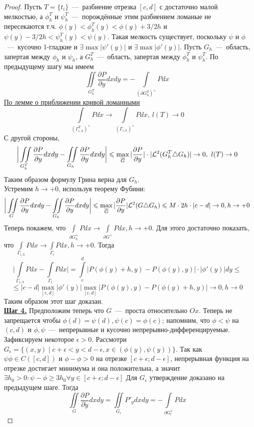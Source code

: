 \begin{proof}
        Пусть $T = \{t_i\}$~---~разбиение отрезка $[c, d]$ с достаточно малой мелкостью, а $\phi_h^T$ и $\psi_h^T$~---~порождённые этим разбиением ломаные не пересекаются т.ч. $\phi(y) < \phi_h^T(y) < \phi(y) + 3/2h$ и $\psi(y) - 3/2h < \psi_h^T(y) < \psi(y)$. Такая мелкость существует, поскольку $\psi$ и $\phi$~---~кусочно 1-гладкие и $\exists \max |\psi'(y)|$ и $\exists \max |\phi'(y)|$. Пусть $G_h$~---~область, запертая между $\phi_h$ и $\psi_h$, а $G_{h}^T$~---~область, запертая между $\phi_h^T$ и $\psi_h^T$. По предыдущему шагу мы имеем \[\iint\limits_{G_h^T} \dfrac{\partial P}{\partial y}dxdy = -\int\limits_{(\partial G_h^T)^+} Pdx\]
        \hyperlink{krivaya_lomanaya}{По лемме о приближении кривой ломанными}\[\int\limits_{(\Gamma_{i, h}^T)^+} Pdx \longrightarrow \int\limits_{(\Gamma_{i, h})^+}Pdx, \  l(T) \rightarrow 0\]
         С другой стороны, \[\biggr|\iint\limits_{G_h^T}\dfrac{\partial P}{\partial y} dxdy - \iint\limits_{G_h}\dfrac{\partial P}{\partial y}dxdy\biggr| \leqslant \max\limits_{\overline{G}}|\dfrac{\partial P}{\partial y}|\cdot |\mathcal{L}^2(G_h^T \triangle G_h)| \rightarrow 0, \  l(T) \rightarrow 0\]
        Таким образом формулу Грина верна для $G_h$. \\
        Устремим $h \rightarrow +0$, используя теорему Фубини:
        \[\biggr|\iint\limits_G \dfrac{\partial P}{\partial y} dxdy - \iint\limits_{G_h} \dfrac{\partial P}{\partial y} dxdy\biggr| \leqslant \max\limits_{\overline{G}} |\dfrac{\partial P}{\partial y}| \mathcal{L}^2(G \triangle G_h) \leqslant M \cdot 2h \cdot |c -d| \rightarrow 0, h \rightarrow +0\]
        Теперь покажем, что $\int\limits_{\partial G_h^+} Pdx \rightarrow \int\limits_{\partial G^+} Pdx, h \rightarrow +0$.
        Для этого достаточно показать, что $\int\limits_{\Gamma_{i, h}}Pdx \rightarrow \int\limits_{\Gamma_i} Pdx, h \rightarrow +0$.
        Тогда \[\biggr|\int\limits_{\Gamma_{1, h}}Pdx - \int\limits_{\Gamma_1}Pdx\biggr| = \int\limits_{c}^{d} |P(\phi(y) + h, y) - P(\phi(y), y)|\cdot|\phi'(y)|dy \leq \]\[ \leq |c - d|\max\limits_{[c, d]}|\phi'(y)| \max\limits_{[c, d]}|P(\phi(y), y) - P(\phi(y) + h, y)| \rightarrow 0, h \rightarrow 0\]
        Таким образом этот шаг доказан.\\
    \textbf{\underline{Шаг 4.}} Предположим теперь что $G$~---~проста относительно $Ox$. Теперь не запрещается чтобы $\phi(d) = \psi(d), \psi(c) = \phi(c)$; напомним, что $\phi < \psi$ на $(c, d)$ и $\phi, \psi$~---~непрерывные и кусочно непрерывно-дифференцируемые. Зафиксируем некоторое $\epsilon > 0$. Рассмотри $G_\epsilon = \{(x, y) \mid c + \epsilon < y < d - \epsilon, x \in (\phi(y), \psi(y))\}$. Так как $\psi \phi \in C([c, d])$ и $\phi - \phi > 0$ на отрезке $[c + \epsilon; d - \epsilon ]$, непрерывная функция на отрезке достигает минимума и она положительна, а значит $\exists h_0 > 0: \psi - \phi \geq 3h_0 \forall y \in [c + \epsilon; d - \epsilon ]$ Для $G_\epsilon$ утверждение доказано на предыдущем шаге. Тогда \[\iint\limits_G \dfrac{\partial P}{\partial y} dxdy = \iint\limits_{G_\epsilon} P'_ydxdy = -\int\limits_{\partial G_\epsilon^+} Pdx\]

\end{proof}
